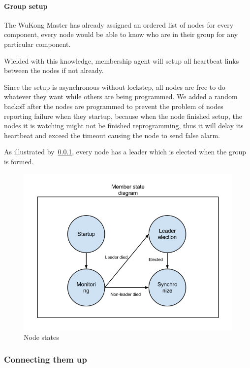 \paragraph{Group setup}

The WuKong Master has already assigned an ordered list of nodes for every component,
every node would be able to know who are in their group for any particular
component.

Wielded with this knowledge, membership agent will setup all heartbeat links
between the nodes if not already.

Since the setup is asynchronous without lockstep, all nodes are free to do
whatever they want while others are being programmed. We added a random backoff
after the nodes are programmed to prevent the problem of nodes reporting 
failure when they startup, because when the node finished setup, the nodes it
is watching might not be finished reprogramming, thus it will delay its
heartbeat and exceed the timeout causing the node to send false alarm.

As illustrated by~\ref{}, every node has a leader which is elected when the
group is formed.

\begin{figure}[h!]
\caption{Node states}
\centering
    \includegraphics[width=\linewidth]{figures/node-states}
\end{figure}

\subsubsection{Connecting them up}

